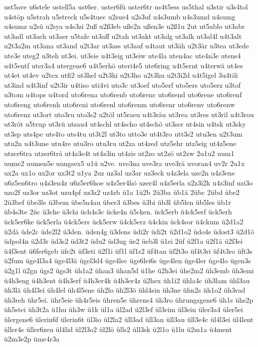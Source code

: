{ust5ave
u6stele
ustell5a
ust6er.
uster6fü
uster6tr
us4t5ess
us5thal
u3stir
u3s4tol
u4stöp
u5strah
u5streck
u5s4tuec
u2sue4
u2s3uf
u4s3umb
u4s3umd
u4sumg
u4sumz
u2sü
u2sya
u4s3zi
2uß
u2ß3eb
uße2n
ußen3e
u2ß1u
2ut
ut5ablo
ut3abr
ut3adl
ut3aeh
ut3aer
u5tafe
ut3aff
u2tah
ut3akt
ut3alg
ut3alk
ut3al4l
u4t3alt
u2t3a2m
ut3ana
ut3and
u2t3ar
ut3ass
ut3auf
u4taut
ut3äh
u2t3är
u3tea
ut3ede
ute3e
uteg2
u3teh
ut3ei.
ut3eie
u4t3eig
ut3eiw
ute4la
uten4ac
ute4n3e
utens4
u4t5entf
uter3a4
utergene6
u4t5erhö
uteri4e5
ute6ring
u4t5ernt
u4terwä
ut4es
ut4et
ut4ev
u2tex
utfi2
ut3hel
u2t3hi
u2t3ho
u2t3hu
u2t3i2d
u4t5igel
3u4tili
ut3ind
u4t3inf
u2t3ir
u4tiso
uti4vi
uto3c
ut3oef
uto5erf
uto5ers
uto5erz
u3tof
u3tom
u4tops
u4tord
uto6rena
uto6renb
uto6renc
uto6rend
uto6rene
uto6renf
uto6reng
uto6renh
uto6reni
uto6renl
uto6renm
uto6renr
uto6renv
uto6renw
uto6renz
ut3ort
uto3ru
uto3s2
u2töl
ut5raeu
u4t3räu
ut3rea
ut3res
ut3ril
u4t3rou
ut3röt
u5trup
ut3rü
utsau4
ut4schl
ut4scho
ut4schö
ut3ser
ut4sin
u4tsk
ut3sky
ut3sp
uts4pe
uts4to
uts4tu
ut3t2l
ut3to
utto3e
ut4t3ro
utt3s2
utu3en
u2t3um
utu2n
u4t3une
utu4re
utu3ro
utu3ru
ut2za
ut4zed
utz5ehr
utz5eig
ut4z5ene
utzer6tra
utzer6trä
ut4z3e4t
ut4z3in
ut4zis
ut2zo
ut2zö
ut2zw
2u1u2
uum1
uume2
uumen5e
uungsex5
u1ü
u2ve.
uve3na
uve3ra
uve3rä
uvoran4
uv2r
2u1x
ux2a
ux1o
ux2or
ux3t2
u1ya
2uz
uz3al
uz3ar
uz3eck
u4z3ela
uze2n
u4z3ene
u6z5en6tro
u4z3en4z
u6z5er6hoe
u4z5er4hö
uzer4l
u4z5erla
u2z3i2k
u4z3inf
uzi3o
uzo2f
uz3or
uz3ot
uzu4pf
uz3z2
uz4zb
ü1a
1ü2b
2ü3ba
üb1ä
2übc
2übd
übe2
2ü3bef
übe3le
ü3bem
übe5n4au
über3
ü3bes
ü3bi
üb3l
üb5len
üb5les
üb1r
üb4s3te
2üc
ü3che
ü3chi
üch4s3c
ücke4n
ü5cken.
ück5erb
ü4ck5erf
ück5erh
ück5er6ke
ück5erla
ü4ck5ers
ück5erw
ü4ck5erz
ü4ckin
ück4sor
ü4ckum
ü2d1a2
ü2dä
üde2c
üde2l2
ü3den.
üden4g
ü3dens
üdi2r
üdi2t
ü2d1o2
üdo4s
üdost3
ü2d1ö
üdpol4n
ü2d3r
üd3s2
üd3t2
üdu2
üd3ug
üe2
üeb3l
ü1ei
2üf
ü2f1a
ü2f1ä
ü2f3ei
ü4f3ent
ü6fer6geb
üfe2t
üf3eti
ü2f1i
üf1l
üf1s2
üf4tan
üf2t3o
üf4t3ri
üf4t3ro
üft3s
ü2fum
üge4l3a4
üge4l3ä
ügel3d4
üge4lec
üge6lei6s
üge4len
üge4ler
üge4lo
ügen3s
ü2g1l
ü2gn
ügs2
ügs3t
üh1a2
ühan3
ühan5d
ü1he
ü2h3ei
ühe2m2
üh3emb
üh3emi
ü4h3eng
ü4h3ent
ü4h3erf
ü4h3er4k
ü4h3er4z
ü2hex
üh1i2
ühla4c
üh3lam
ühl3au
üh3lä
üh4l3ei
üh4lel
üh4l5ene
üh2lo
üh2l3ö
ühl4sin
üh3ne
ühn2s
üh1o2
üh3rad
üh3reh
ühr5ei.
ühr5eie
üh4r5eis
ühren5e
ührens4
üh3ro
ührungsgene6
üh1s
ühs2p
üh5stei
üh3t2a
ü1hu
üh3w
ü1k
ül1a
ül2ad
ü2l3ef
ül3eim
ül3ein
üler3a4
üler5ei
ülergene6
ülerin6f
ülerin6t
ül3io
ül2la2
üll3ad
üll3an
üll3au
üll3e4c
ül4l3ei
ül4lent
üller4s
üller6zeu
ül4lid
ül2l3o2
ül2lö
ülls2
üll3sk
ü2l1o
ü1lu
ü2m1a
ü4ment
ü2m3e2p
üme4r3a
}
